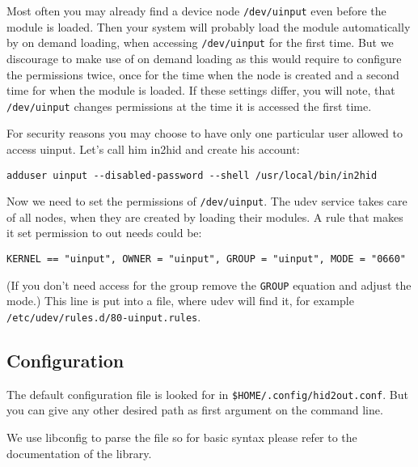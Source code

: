 Most often you may already find a device node \verb|/dev/uinput|
even before the module is loaded. 
Then your system will probably load the module automatically
by on demand loading, when accessing \verb|/dev/uinput|
for the first time.
But we discourage to make use of on demand loading as
this would require to configure the permissions twice,
once for the time when the node is created and a second
time for when the module is loaded. If these settings
differ, you will note, that \verb|/dev/uinput| changes permissions
at the time it is accessed the first time.

For security reasons you may choose to have only
one particular user allowed to access uinput.
Let's call him in2hid and create his account:
\begin{verbatim}
adduser uinput --disabled-password --shell /usr/local/bin/in2hid
\end{verbatim}

Now we need to set the permissions of \verb|/dev/uinput|.
The udev service takes care of all nodes, when they are created
by loading their modules.
A rule that makes it set permission to out needs could be:

\begin{verbatim}
KERNEL == "uinput", OWNER = "uinput", GROUP = "uinput", MODE = "0660"
\end{verbatim}

(If you don't need access for the group remove the \texttt{GROUP}
 equation and adjust the mode.)
This line is put into a file, where udev will find it, for example
\verb|/etc/udev/rules.d/80-uinput.rules|.

\subsection{Configuration}
The default configuration file is looked for in 
\verb|$HOME/.config/hid2out.conf|. But you can give any other 
desired path as first argument on the command line.

We use libconfig to parse the file so for basic syntax please 
refer to the documentation of the library.

